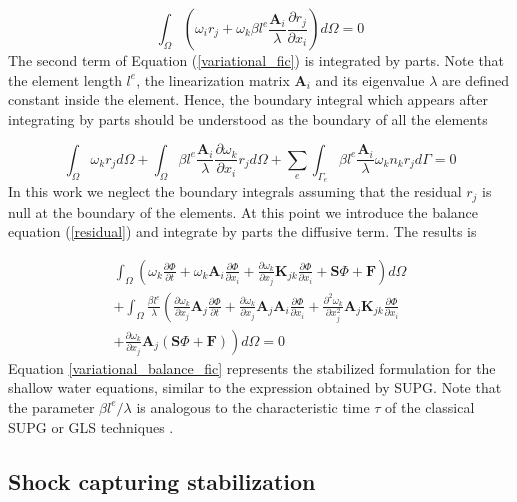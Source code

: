 \documentclass[a4paper,12pt]{article}
\newcommand{\pder}[2]{\frac{\partial#1}{\partial#2}}
\newcommand{\ppder}[2]{\frac{\partial^2#1}{\partial#2^2}}
\begin{document}
\begin{equation} \label{variational_fic}
\int_\Omega \left(
    \omega_i r_j + \omega_k \beta l^e\frac{\mathbf{A}_i}{\lambda}\pder{r_j}{x_i}
\right) d\Omega = 0
\end{equation}
The second term of Equation (\ref{variational_fic}) is integrated by parts. Note that the element length $l^e$, the linearization matrix $\mathbf{A}_i$ and its eigenvalue $\lambda$ are defined constant inside the element. Hence, the boundary integral which appears after integrating by parts should be understood as the boundary of all the elements

\begin{equation} \label{variational_fic_parts}
\int_\Omega \omega_k r_j d\Omega
+ \int_\Omega \beta l^e\frac{\mathbf{A}_i}{\lambda}\pder{\omega_k}{x_i} r_j d\Omega
+ \sum_e \int_{\Gamma_e} \beta l^e\frac{\mathbf{A}_i}{\lambda}\omega_kn_kr_j d\Gamma = 0
\end{equation}
In this work we neglect the boundary integrals assuming that the residual $r_j$ is null at the boundary of the elements. At this point we introduce the balance equation (\ref{residual}) and integrate by parts the diffusive term. The results is

\begin{multline} \label{variational_balance_fic}
\int_\Omega \left(
    \omega_k \pder{\Phi}{t} + \omega_k \mathbf{A}_i\pder{\Phi}{x_i}
    + \pder{\omega_k}{x_j} \mathbf{K}_{jk} \pder{\Phi}{x_i} + \mathbf{S}\Phi + \mathbf{F}
\right) d\Omega\\ +
\int_\Omega \frac{\beta l^e}{\lambda} \left(
    \pder{\omega_k}{x_j} \mathbf{A}_j \pder{\Phi}{t}
    + \pder{\omega_k}{x_j} \mathbf{A}_j\mathbf{A}_i\pder{\Phi}{x_i}
    + \ppder{\omega_k}{x_j} \mathbf{A}_j\mathbf{K}_{jk} \pder{\Phi}{x_i} \right. \\
    \left.
    + \pder{\omega_k}{x_j} \mathbf{A}_j(\mathbf{S}\Phi + \mathbf{F})
\right) d\Omega
=0
\end{multline}
Equation \ref{variational_balance_fic} represents the stabilized formulation for the shallow water equations, similar to the expression obtained by SUPG. Note that the parameter $\beta l^e/\lambda$ is analogous to the characteristic time $\tau$ of the classical SUPG or GLS techniques \cite{cotela2016}.

\subsection{Shock capturing stabilization}
\end{document}
